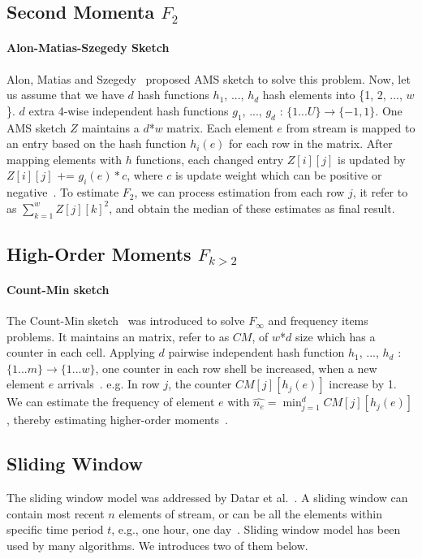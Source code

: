 \subsection{Second Momenta $F_2$}
\paragraph{Alon-Matias-Szegedy Sketch}
Alon, Matias and Szegedy~\cite{alon1999space} proposed AMS sketch to solve this
problem. Now, let us assume that we have $d$ hash functions $h_1$, ..., $h_d$
hash elements into \{1, 2, ..., $w$\}. $d$ extra 4-wise independent hash
functions $g_1$, ..., $g_d$ : $\{1...U\}\rightarrow \{-1, 1\}$. One AMS sketch
$Z$ maintains a $d$*$w$ matrix. Each element $e$ from stream is mapped to an
entry based on the hash function $h_i(e)$ for each row in the matrix. After
mapping elements with $h$ functions, each changed entry $Z[i][j]$ is updated by
$Z[i][j]$ += $g_i(e)*c$, where $c$ is update weight which can be positive or
negative~\cite{garofalakis2016data}. To estimate $F_2$, we can process
estimation from each row $j$, it refer to as $\sum_{k=1}^w Z[j][k]^2$, and
obtain the median of these estimates as final result.

\subsection{High-Order Moments $F_{k>2}$}
\paragraph{Count-Min sketch}
The Count-Min sketch~\cite{cormode2005improved} was introduced to solve
$F_\infty$ and frequency items problems. It maintains an matrix, refer to as
$CM$, of $w$*$d$ size which has a counter in each cell. Applying $d$ pairwise
independent hash function $h_1$, ..., $h_d$ : $\{1...m\} \rightarrow \{1...w\}$,
one counter in each row shell be increased, when a new element $e$
arrivals~\cite{garofalakis2016data}. e.g. In row $j$, the counter
$CM[j][h_j(e)]$ increase by 1. We can estimate the frequency of element $e$ with
$\hat{n_e} = \min_{j=1}^d CM[j][h_j(e)]$, thereby estimating higher-order
moments~\cite{cormode2005improved}.


\subsection{Sliding Window}
The sliding window model was addressed by Datar et
al.~\cite{datar2002maintaining}. A sliding window can contain most recent $n$
elements of stream, or can be all the elements within specific time period $t$,
e.g., one hour, one day~\cite{leskovec2014mining}. Sliding window model has been
used by many algorithms. We introduces two of them below.

